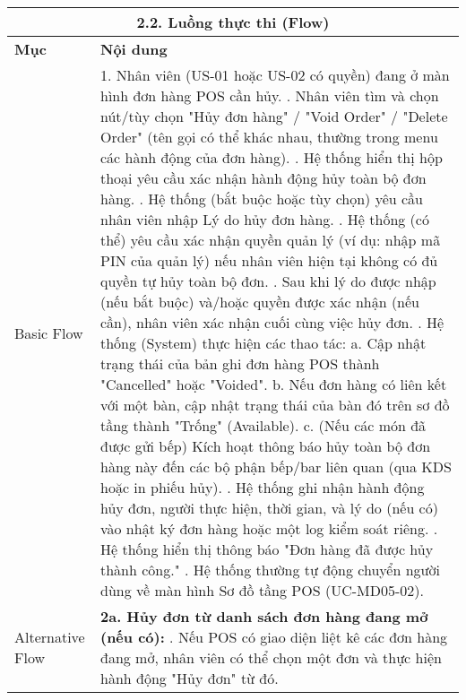 \begin{longtable}{|m{4cm}|p{11cm}|}
\hline
\multicolumn{2}{|c|}{\textbf{2.2. Luồng thực thi (Flow)}} \\
\hline
\textbf{Mục} & \textbf{Nội dung} \\
\hline
Basic Flow & 1. Nhân viên (US-01 hoặc US-02 có quyền) đang ở màn hình đơn hàng POS cần hủy. \newline 2. Nhân viên tìm và chọn nút/tùy chọn "Hủy đơn hàng" / "Void Order" / "Delete Order" (tên gọi có thể khác nhau, thường trong menu các hành động của đơn hàng). \newline 3. Hệ thống hiển thị hộp thoại yêu cầu xác nhận hành động hủy toàn bộ đơn hàng. \newline 4. Hệ thống (bắt buộc hoặc tùy chọn) yêu cầu nhân viên nhập Lý do hủy đơn hàng. \newline 5. Hệ thống (có thể) yêu cầu xác nhận quyền quản lý (ví dụ: nhập mã PIN của quản lý) nếu nhân viên hiện tại không có đủ quyền tự hủy toàn bộ đơn. \newline 6. Sau khi lý do được nhập (nếu bắt buộc) và/hoặc quyền được xác nhận (nếu cần), nhân viên xác nhận cuối cùng việc hủy đơn. \newline 7. Hệ thống (System) thực hiện các thao tác: \newline    a. Cập nhật trạng thái của bản ghi đơn hàng POS thành "Cancelled" hoặc "Voided". \newline    b. Nếu đơn hàng có liên kết với một bàn, cập nhật trạng thái của bàn đó trên sơ đồ tầng thành "Trống" (Available). \newline    c. (Nếu các món đã được gửi bếp) Kích hoạt thông báo hủy toàn bộ đơn hàng này đến các bộ phận bếp/bar liên quan (qua KDS hoặc in phiếu hủy). \newline 8. Hệ thống ghi nhận hành động hủy đơn, người thực hiện, thời gian, và lý do (nếu có) vào nhật ký đơn hàng hoặc một log kiểm soát riêng. \newline 9. Hệ thống hiển thị thông báo "Đơn hàng đã được hủy thành công." \newline 10. Hệ thống thường tự động chuyển người dùng về màn hình Sơ đồ tầng POS (UC-MD05-02). \\
\hline
Alternative Flow & \textbf{2a. Hủy đơn từ danh sách đơn hàng đang mở (nếu có):} \newline    1. Nếu POS có giao diện liệt kê các đơn hàng đang mở, nhân viên có thể chọn một đơn và thực hiện hành động "Hủy đơn" từ đó. \\
\hline

\end{longtable}
